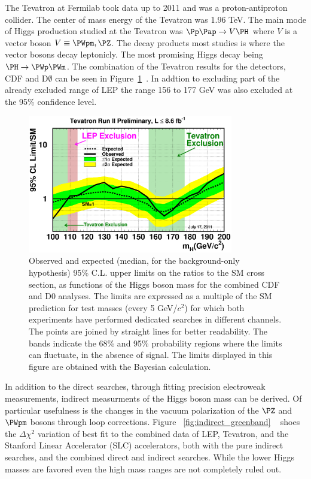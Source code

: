 The Tevatron at Fermilab took data up to 2011 and was a proton-antiproton collider.  The center of mass energy of the Tevatron was 1.96 TeV.  The main mode of Higgs production studied at the Tevatron was $\Pp\Pap \rightarrow V\PH$ where $V$ is a vector boson $V\equiv \PWpm,\PZ$.  The decay products most studies is where the vector bosons decay leptonicly.  The most promising Higgs decay being $\PH \rightarrow \PWp\PWm$.  The combination of the Tevatron results for the detectors, CDF and D$\emptyset$ can be seen in Figure~\ref{fig:comboRatio}~\cite{CDFandD0:2011aa}. In addtion to excluding part of the already excluded range of LEP the range 156 to 177 GeV was also excluded at the 95\% confidence level.

\begin{figure}[htb]
\centering
\includegraphics[width=0.8\textwidth]{StandardModel/tevbayeslimits17july2011.eps}
\caption{\small Observed and expected (median, for the background-only hypothesis)
95\% C.L. upper limits on the ratios to the SM cross section, as
functions of the Higgs boson mass
for the combined CDF and D0 analyses.
The limits are expressed as a multiple of the SM prediction
for test masses (every 5 GeV/$c^2$)
for which both experiments have performed dedicated
searches in different channels.
The points are joined by straight lines
for better readability.
  The bands indicate the
68\% and 95\% probability regions where the limits can
fluctuate, in the absence of signal.
The limits displayed in this figure
are obtained with the Bayesian calculation.~\cite{CDFandD0:2011aa}
}
\label{fig:comboRatio}
\end{figure}


In addition to the direct searches, through fitting precision electroweak measurements, indirect measurments of the Higgs boson mass can be derived. Of particular usefulness is the changes in the vacuum polarization of the $\PZ$ and $\PWpm$ bosons through loop corrections. Figure ~\ref{fig:indirect_greenband}
~\cite{Flacher:2008zq} shoes the $\Delta\chi^2$ variation of best fit to the combined data of LEP, Tevatron, and the Stanford Linear Accelerator (SLC) accelerators, both with the pure indirect searches, and the combined direct and indirect searches.  While the lower Higgs masses are favored even the high mass ranges are not completely ruled out.

